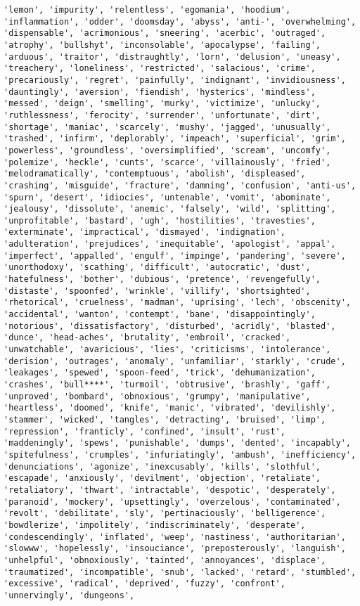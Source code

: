 \documentclass[11pt]{article}
\begin{document}
\begin{Verbatim}[commandchars=\\\{\}]
'lemon', 'impurity', 'relentless', 'egomania', 'hoodium', 'inflammation', 'odder', 'doomsday', 'abyss', 'anti-', 'overwhelming', 'dispensable', 'acrimonious', 'sneering', 'acerbic', 'outraged', 'atrophy', 'bullshyt', 'inconsolable', 'apocalypse', 'failing', 'arduous', 'traitor', 'distraughtly', 'lorn', 'delusion', 'uneasy', 'treachery', 'loneliness', 'restricted', 'salacious', 'crime', 'precariously', 'regret', 'painfully', 'indignant', 'invidiousness', 'dauntingly', 'aversion', 'fiendish', 'hysterics', 'mindless', 'messed', 'deign', 'smelling', 'murky', 'victimize', 'unlucky', 'ruthlessness', 'ferocity', 'surrender', 'unfortunate', 'dirt', 'shortage', 'maniac', 'scarcely', 'mushy', 'jagged', 'unusually', 'trashed', 'infirm', 'deplorably', 'impeach', 'superficial', 'grim', 'powerless', 'groundless', 'oversimplified', 'scream', 'uncomfy', 'polemize', 'heckle', 'cunts', 'scarce', 'villainously', 'fried', 'melodramatically', 'contemptuous', 'abolish', 'displeased', 'crashing', 'misguide', 'fracture', 'damning', 'confusion', 'anti-us', 'spurn', 'desert', 'idiocies', 'untenable', 'vomit', 'abominate', 'jealousy', 'dissolute', 'anemic', 'falsely', 'wild', 'splitting', 'unprofitable', 'bastard', 'ugh', 'hostilities', 'travesties', 'exterminate', 'impractical', 'dismayed', 'indignation', 'adulteration', 'prejudices', 'inequitable', 'apologist', 'appal', 'imperfect', 'appalled', 'engulf', 'impinge', 'pandering', 'severe', 'unorthodoxy', 'scathing', 'difficult', 'autocratic', 'dust', 'hatefulness', 'bother', 'dubious', 'pretence', 'revengefully', 'distaste', 'spoonfed', 'wrinkle', 'villify', 'shortsighted', 'rhetorical', 'cruelness', 'madman', 'uprising', 'lech', 'obscenity', 'accidental', 'wanton', 'contempt', 'bane', 'disappointingly', 'notorious', 'dissatisfactory', 'disturbed', 'acridly', 'blasted', 'dunce', 'head-aches', 'brutality', 'embroil', 'cracked', 'unwatchable', 'avaricious', 'lies', 'criticisms', 'intolerance', 'derision', 'outrages', 'anomaly', 'unfamiliar', 'starkly', 'crude', 'leakages', 'spewed', 'spoon-feed', 'trick', 'dehumanization', 'crashes', 'bull****', 'turmoil', 'obtrusive', 'brashly', 'gaff', 'unproved', 'bombard', 'obnoxious', 'grumpy', 'manipulative', 'heartless', 'doomed', 'knife', 'manic', 'vibrated', 'devilishly', 'stammer', 'wicked', 'tangles', 'detracting', 'bruised', 'limp', 'repression', 'franticly', 'confined', 'insult', 'rust', 'maddeningly', 'spews', 'punishable', 'dumps', 'dented', 'incapably', 'spitefulness', 'crumples', 'infuriatingly', 'ambush', 'inefficiency', 'denunciations', 'agonize', 'inexcusably', 'kills', 'slothful', 'escapade', 'anxiously', 'devilment', 'objection', 'retaliate', 'retaliatory', 'thwart', 'intractable', 'despotic', 'desperately', 'paranoid', 'mockery', 'upsettingly', 'overzelous', 'contaminated', 'revolt', 'debilitate', 'sly', 'pertinaciously', 'belligerence', 'bowdlerize', 'impolitely', 'indiscriminately', 'desperate', 'condescendingly', 'inflated', 'weep', 'nastiness', 'authoritarian', 'slowww', 'hopelessly', 'insouciance', 'preposterously', 'languish', 'unhelpful', 'obnoxiously', 'tainted', 'annoyances', 'displace', 'traumatized', 'incompatible', 'snub', 'lacked', 'retard', 'stumbled', 'excessive', 'radical', 'deprived', 'fuzzy', 'confront', 'unnervingly', 'dungeons', 
\end{Verbatim}
\end{document}

